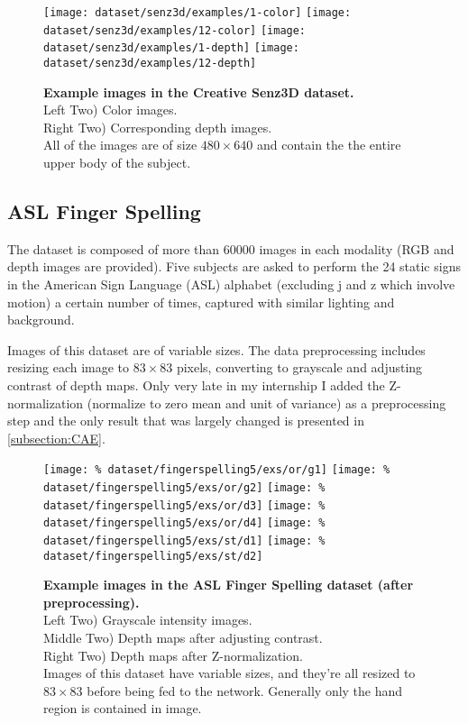\begin{figure}[H]
  \centering
  \hfill
  \texttt{[image: dataset/senz3d/examples/1-color]}
  \hfill
  \texttt{[image: dataset/senz3d/examples/12-color]}
  \hfill
  \texttt{[image: dataset/senz3d/examples/1-depth]}
  \hfill
  \texttt{[image: dataset/senz3d/examples/12-depth]}
  \caption{%
    \textbf{Example images in the Creative Senz3D dataset.}\\[0.1em]
    Left Two) Color images.\\[0.1em]
    Right Two) Corresponding depth images.\\[0.1em]
    All of the images are of size $480 \times 640$ and contain the
      the entire upper body of the subject.}
  \label{fig:senz3d_exs}
\end{figure}

\subsection{ASL Finger Spelling}

The dataset is composed of more than 60000 images in each modality
(RGB and depth images are provided).
Five subjects are asked to perform the 24 static signs in
the American Sign Language (ASL) alphabet (excluding j and z which involve
motion) a certain number of times, captured with similar lighting
and background.

Images of this dataset are of variable sizes. The data preprocessing
includes resizing each image to $83 \times 83$ pixels,
converting to grayscale and adjusting
contrast of depth maps. Only very late in my internship I added the
Z-normalization (normalize to zero mean and unit of variance)
as a preprocessing step and the only result that was largely changed
is presented in \ref{subsection:CAE}.

\begin{figure}[H]
  \centering
  \hfill
  \texttt{[image: \%
    dataset/fingerspelling5/exs/or/g1]}
  \hfill
  \texttt{[image: \%
    dataset/fingerspelling5/exs/or/g2]}
  \hfill
  \texttt{[image: \%
    dataset/fingerspelling5/exs/or/d3]}
  \hfill
  \texttt{[image: \%
    dataset/fingerspelling5/exs/or/d4]}
  \hfill
  \texttt{[image: \%
    dataset/fingerspelling5/exs/st/d1]}
  \hfill
  \texttt{[image: \%
    dataset/fingerspelling5/exs/st/d2]}
  \caption{%
    \textbf{Example images in the ASL Finger Spelling dataset
      (after preprocessing).}\\[0.1em]
    Left Two) Grayscale intensity images.\\[0.1em]
    Middle Two) Depth maps after adjusting contrast.\\[0.1em]
    Right Two) Depth maps after Z-normalization.\\[0.1em]
    Images of this dataset have variable sizes, and they're all resized to
      $83 \times 83$ before being fed to the network. Generally only the
      hand region is contained in image.}
  \label{fig:fingerspelling_exs}
\end{figure}

